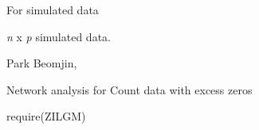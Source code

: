 \documentclass[a4paper]{book}
\begin{document}
%
\begin{Details}\relax
For simulated data
\end{Details}
%
\begin{Value}
\begin{ldescription}
\item[\code{X}] \emph{n} x \emph{p} simulated data.
\end{ldescription}
\end{Value}
%
\begin{Author}\relax
Park Beomjin,
\end{Author}
%
\begin{References}\relax
Network analysis for Count data with excess zeros
\end{References}
%
\begin{SeeAlso}\relax
{}
\end{SeeAlso}
%
\begin{Examples}
\begin{ExampleCode}
require(ZILGM)
\end{ExampleCode}
\end{Examples}
\printindex{}
\end{document}
